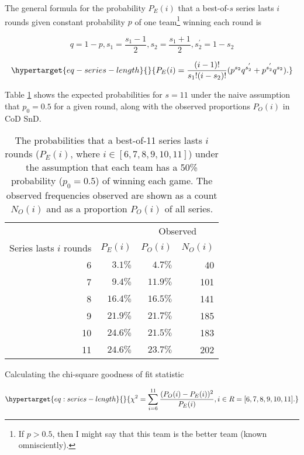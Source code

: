 \documentclass{article}
\begin{document}
The general formula for the probability \(P_E(i)\) that a best-of-\(s\)
series lasts \(i\) rounds given constant probability \(p\) of one
team\footnote{If \(p > 0.5\), then I might say that this team is the
  better team (known omnisciently).} winning each round is

\[
q = 1 - p, s_1 = \frac{s_1 - 1}{2}, s_2 = \frac{s_1 + 1}{2}, s_2^{'} = 1 - s_2
\]

\begin{equation}\protect\hypertarget{eq-series-length}{}{
P_E(i) = \frac{(i - 1)!}{s_1!(i - s_2)!}(p^{s_2}q^{s_2^{'}} + p^{s_2^{'}}q^{s_2}).
}\label{eq:series-length}\end{equation}

Table \ref{tbl:cod-prob-series-lasting-i-rounds} shows the expected
probabilities for \(s = 11\) under the naive assumption that
\(p_0 = 0.5\) for a given round, along with the observed proportions
\(P_O(i)\) in CoD SnD.

\begin{longtable}{rrrr}
\caption{The probabilities that a best-of-11 series lasts $i$ rounds ($P_E(i)$, where $i \in [6, 7, 8, 9, 10, 11]$) under the assumption that each team has a 50\% probability ($p_0 = 0.5$) of winning each game. The observed frequencies observed are shown as a count $N_O(i)$ and as a proportion $P_O(i)$ of all series.}\label{tbl:cod-prob-series-lasting-i-rounds} \\
\toprule
&  & \multicolumn{2}{c}{Observed} \\ 
\cmidrule(lr){3-4}
Series lasts $i$ rounds & $P_E(i)$ & $P_O(i)$ & $N_O(i)$ \\ 
\midrule
6 & $3.1\%$ & $4.7\%$ & 40 \\ 
7 & $9.4\%$ & $11.9\%$ & 101 \\ 
8 & $16.4\%$ & $16.5\%$ & 141 \\ 
9 & $21.9\%$ & $21.7\%$ & 185 \\ 
10 & $24.6\%$ & $21.5\%$ & 183 \\ 
11 & $24.6\%$ & $23.7\%$ & 202 \\ 
\bottomrule
\end{longtable}

Calculating the chi-square goodness of fit statistic

\begin{equation}\protect\hypertarget{eq:series-length}{}{
\chi^2 = \sum^{11}_{i=6} \frac{(P_O(i) - P_E(i))^2}{P_E(i)}, i \in R = [6, 7, 8, 9, 10, 11].
}\label{eq:chi-squ-test}\end{equation}
\end{document}
